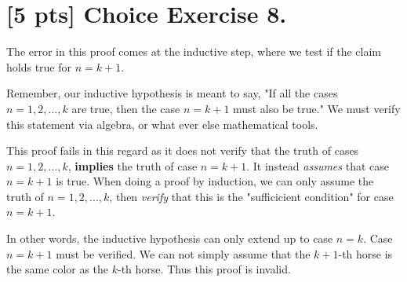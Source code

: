 \documentclass{article}
\begin{document}
\section*{[5 pts] Choice Exercise 8.}

The error in this proof comes at the inductive step, where we test if the claim 
holds true for \(n = k+1\). 

Remember, our inductive hypothesis is meant to say, "If all the cases \(n = 1, 2, ..., k\) 
are true, then the case \(n = k+1\) must also be true." We must verify this statement
via algebra, or what ever else mathematical tools. 

This proof fails in this regard as it does not verify that the truth of cases 
\(n = 1, 2, ..., k\), \textbf{implies} the truth of case \(n = k+1\). It instead 
\textit{assumes} that case \(n = k+1\) is true. When doing a proof by induction,
we can only assume the truth of \(n = 1, 2, ..., k\), then \textit{verify} that 
this is the "sufficicient condition" for case \(n = k+1\).

In other words, the inductive hypothesis can only extend up to case \(n = k\).
Case \(n = k+1\) must be verified. We can not simply assume that the \(k+1\)-th 
horse is the same color as the \(k\)-th horse. Thus this proof is invalid.
\end{document}
